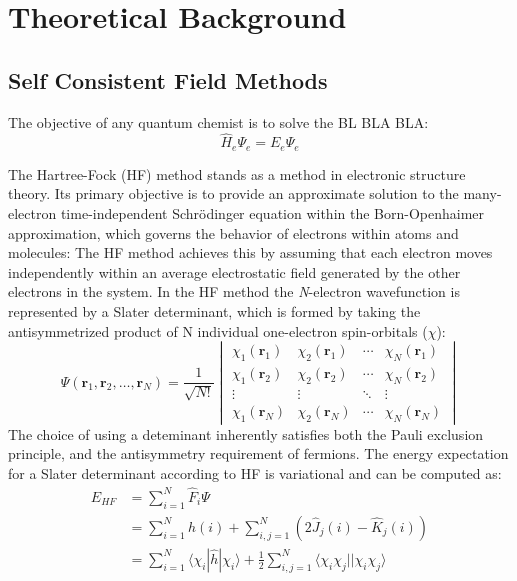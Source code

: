 \chapter{Theoretical Background}\label{ch:theory}

\section{Self Consistent Field Methods} \label{sec:SCF}
The objective of any quantum chemist is to solve the BL BLA BLA:
\begin{equation}\label{eq:TISE}
    \hat{H}_e \Psi_e = E_e \Psi_e
\end{equation}

The Hartree-Fock (HF) method stands as a method in electronic structure theory. Its primary objective is to provide an approximate solution to the many-electron time-independent Schrödinger equation within the Born-Openhaimer approximation, which governs the behavior of electrons within atoms and molecules:
The HF method achieves this by assuming that each electron moves independently within an average electrostatic field generated by the other electrons in the system. In the HF method the \textit{N}-electron wavefunction is represented by a Slater determinant, which is formed by taking the antisymmetrized product of N individual one-electron spin-orbitals ($\chi$):
\begin{equation}\label{eq:SlaterDet}
    \Psi(\mathbf{r}_1, \mathbf{r}_2, \dots, \mathbf{r}_N) = \frac{1}{\sqrt{N!}}
    \begin{vmatrix}
      \chi_1(\mathbf{r}_1) & \chi_2(\mathbf{r}_1) & \cdots & \chi_N(\mathbf{r}_1) \\
      \chi_1(\mathbf{r}_2) & \chi_2(\mathbf{r}_2) & \cdots & \chi_N(\mathbf{r}_2) \\
      \vdots & \vdots & \ddots & \vdots \\
      \chi_1(\mathbf{r}_N) & \chi_2(\mathbf{r}_N) & \cdots & \chi_N(\mathbf{r}_N)
    \end{vmatrix}
  \end{equation}
The choice of using a deteminant inherently satisfies both the Pauli exclusion principle, and the antisymmetry requirement of fermions. The energy expectation for a Slater determinant according to HF is variational and can be computed as:
\begin{equation}\label{EHF} %
    \begin{aligned}
        E_{HF} &= \sum_{i=1}^{N} \hat{F}_i \Psi \\
            &= \sum_{i=1}^{N} \hat{h}(i) + \sum_{i,j=1}^{N} (2\hat{J}_j(i) - \hat{K}_j(i)) \\ 
            &= \sum_{i=1}^{N} \langle \chi_i | \hat{h} | \chi_i \rangle + \frac{1}{2} \sum_{i,j=1}^{N} \langle \chi_i \chi_j || \chi_i \chi_j \rangle
    \end{aligned}
\end{equation}
